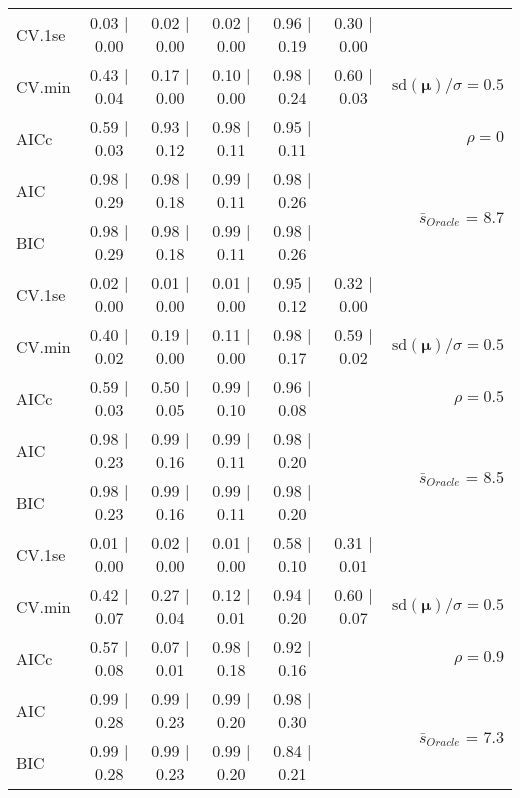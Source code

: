 \begin{table}
\begin{center}
\begin{tabular}{l*{5}{c}|r}
 \hline 
CV.1se & 0.03 $\mid$ 0.00 & 0.02 $\mid$ 0.00 & 0.02 $\mid$ 0.00 & 0.96 $\mid$ 0.19 & 0.30 $\mid$ 0.00 & \\
CV.min & 0.43 $\mid$ 0.04 & 0.17 $\mid$ 0.00 & 0.10 $\mid$ 0.00 & 0.98 $\mid$ 0.24 & 0.60 $\mid$ 0.03 &  $\mathrm{sd}(\mathbf{\mu})/\sigma=0.5$ \\
AICc & 0.59 $\mid$ 0.03 & 0.93 $\mid$ 0.12 & 0.98 $\mid$ 0.11 & 0.95 $\mid$ 0.11 & & $\rho=0$ \\
AIC & 0.98 $\mid$ 0.29 & 0.98 $\mid$ 0.18 & 0.99 $\mid$ 0.11 & 0.98 $\mid$ 0.26 & &  \multirow{2}{*}{$\bar{s}_{Oracle}$ = 8.7} \\
BIC & 0.98 $\mid$ 0.29 & 0.98 $\mid$ 0.18 & 0.99 $\mid$ 0.11 & 0.98 $\mid$ 0.26 & &  \\
 \hline 
CV.1se & 0.02 $\mid$ 0.00 & 0.01 $\mid$ 0.00 & 0.01 $\mid$ 0.00 & 0.95 $\mid$ 0.12 & 0.32 $\mid$ 0.00 & \\
CV.min & 0.40 $\mid$ 0.02 & 0.19 $\mid$ 0.00 & 0.11 $\mid$ 0.00 & 0.98 $\mid$ 0.17 & 0.59 $\mid$ 0.02 &  $\mathrm{sd}(\mathbf{\mu})/\sigma=0.5$ \\
AICc & 0.59 $\mid$ 0.03 & 0.50 $\mid$ 0.05 & 0.99 $\mid$ 0.10 & 0.96 $\mid$ 0.08 & & $\rho=0.5$ \\
AIC & 0.98 $\mid$ 0.23 & 0.99 $\mid$ 0.16 & 0.99 $\mid$ 0.11 & 0.98 $\mid$ 0.20 & &  \multirow{2}{*}{$\bar{s}_{Oracle}$ = 8.5} \\
BIC & 0.98 $\mid$ 0.23 & 0.99 $\mid$ 0.16 & 0.99 $\mid$ 0.11 & 0.98 $\mid$ 0.20 & &  \\
 \hline 
CV.1se & 0.01 $\mid$ 0.00 & 0.02 $\mid$ 0.00 & 0.01 $\mid$ 0.00 & 0.58 $\mid$ 0.10 & 0.31 $\mid$ 0.01 & \\
CV.min & 0.42 $\mid$ 0.07 & 0.27 $\mid$ 0.04 & 0.12 $\mid$ 0.01 & 0.94 $\mid$ 0.20 & 0.60 $\mid$ 0.07 &  $\mathrm{sd}(\mathbf{\mu})/\sigma=0.5$ \\
AICc & 0.57 $\mid$ 0.08 & 0.07 $\mid$ 0.01 & 0.98 $\mid$ 0.18 & 0.92 $\mid$ 0.16 & & $\rho=0.9$ \\
AIC & 0.99 $\mid$ 0.28 & 0.99 $\mid$ 0.23 & 0.99 $\mid$ 0.20 & 0.98 $\mid$ 0.30 & &  \multirow{2}{*}{$\bar{s}_{Oracle}$ = 7.3} \\
BIC & 0.99 $\mid$ 0.28 & 0.99 $\mid$ 0.23 & 0.99 $\mid$ 0.20 & 0.84 $\mid$ 0.21 & &  \\
 \hline 
\end{tabular}
\end{center}
\vspace{-1cm}
\end{table}




